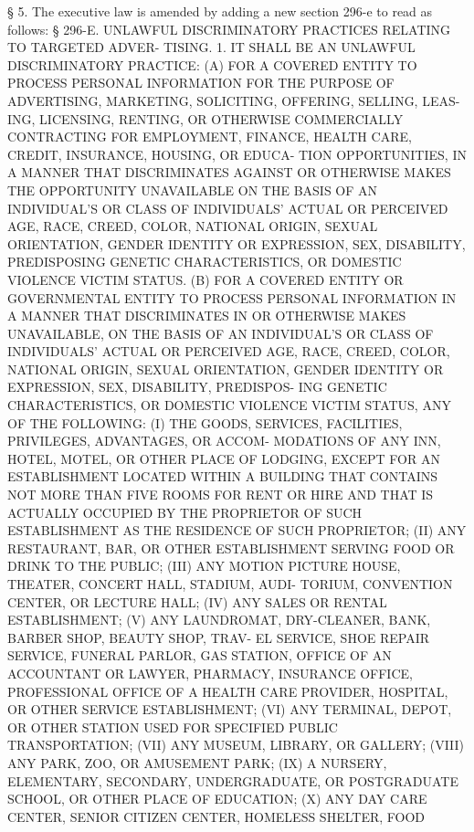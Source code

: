    § 5. The executive law is amended by adding a  new  section  296-e  to
 read as follows:
   § 296-E. UNLAWFUL DISCRIMINATORY PRACTICES RELATING TO TARGETED ADVER-
 TISING. 1. IT SHALL BE AN UNLAWFUL DISCRIMINATORY PRACTICE:
   (A)  FOR  A  COVERED  ENTITY  TO  PROCESS PERSONAL INFORMATION FOR THE
 PURPOSE OF ADVERTISING, MARKETING, SOLICITING, OFFERING, SELLING,  LEAS-
 ING,  LICENSING,  RENTING,  OR  OTHERWISE  COMMERCIALLY  CONTRACTING FOR
 EMPLOYMENT, FINANCE, HEALTH CARE, CREDIT, INSURANCE, HOUSING, OR  EDUCA-
 TION  OPPORTUNITIES, IN A MANNER THAT DISCRIMINATES AGAINST OR OTHERWISE
 MAKES THE OPPORTUNITY UNAVAILABLE ON THE BASIS  OF  AN  INDIVIDUAL'S  OR
 CLASS  OF  INDIVIDUALS'  ACTUAL  OR  PERCEIVED  AGE, RACE, CREED, COLOR,
 NATIONAL ORIGIN, SEXUAL ORIENTATION, GENDER IDENTITY OR EXPRESSION, SEX,
 DISABILITY, PREDISPOSING GENETIC CHARACTERISTICS, OR  DOMESTIC  VIOLENCE
 VICTIM STATUS.
   (B)  FOR  A  COVERED ENTITY OR GOVERNMENTAL ENTITY TO PROCESS PERSONAL
 INFORMATION IN  A  MANNER  THAT  DISCRIMINATES  IN  OR  OTHERWISE  MAKES
 UNAVAILABLE,  ON  THE  BASIS OF AN INDIVIDUAL'S OR CLASS OF INDIVIDUALS'
 ACTUAL OR PERCEIVED AGE, RACE, CREED,  COLOR,  NATIONAL  ORIGIN,  SEXUAL
 ORIENTATION,  GENDER IDENTITY OR EXPRESSION, SEX, DISABILITY, PREDISPOS-
 ING GENETIC CHARACTERISTICS, OR DOMESTIC VIOLENCE VICTIM STATUS, ANY  OF
 THE FOLLOWING:
   (I) THE GOODS, SERVICES, FACILITIES, PRIVILEGES, ADVANTAGES, OR ACCOM-
 MODATIONS  OF  ANY  INN, HOTEL, MOTEL, OR OTHER PLACE OF LODGING, EXCEPT
 FOR AN ESTABLISHMENT LOCATED WITHIN A BUILDING THAT  CONTAINS  NOT  MORE
 THAN  FIVE  ROOMS  FOR RENT OR HIRE AND THAT IS ACTUALLY OCCUPIED BY THE
 PROPRIETOR OF SUCH ESTABLISHMENT AS THE RESIDENCE OF SUCH PROPRIETOR;
   (II) ANY RESTAURANT, BAR, OR OTHER ESTABLISHMENT SERVING FOOD OR DRINK
 TO THE PUBLIC;
   (III) ANY MOTION PICTURE HOUSE, THEATER, CONCERT HALL, STADIUM,  AUDI-
 TORIUM, CONVENTION CENTER, OR LECTURE HALL;
   (IV) ANY SALES OR RENTAL ESTABLISHMENT;
   (V) ANY LAUNDROMAT, DRY-CLEANER, BANK, BARBER SHOP, BEAUTY SHOP, TRAV-
 EL  SERVICE, SHOE REPAIR SERVICE, FUNERAL PARLOR, GAS STATION, OFFICE OF
 AN ACCOUNTANT OR LAWYER, PHARMACY, INSURANCE OFFICE, PROFESSIONAL OFFICE
 OF A HEALTH CARE PROVIDER, HOSPITAL, OR OTHER SERVICE ESTABLISHMENT;
   (VI) ANY TERMINAL, DEPOT, OR OTHER STATION USED FOR  SPECIFIED  PUBLIC
 TRANSPORTATION;
   (VII) ANY MUSEUM, LIBRARY, OR GALLERY;
   (VIII) ANY PARK, ZOO, OR AMUSEMENT PARK;
   (IX)  A NURSERY, ELEMENTARY, SECONDARY, UNDERGRADUATE, OR POSTGRADUATE
 SCHOOL, OR OTHER PLACE OF EDUCATION;
   (X) ANY DAY CARE CENTER, SENIOR CITIZEN CENTER, HOMELESS SHELTER, FOOD
